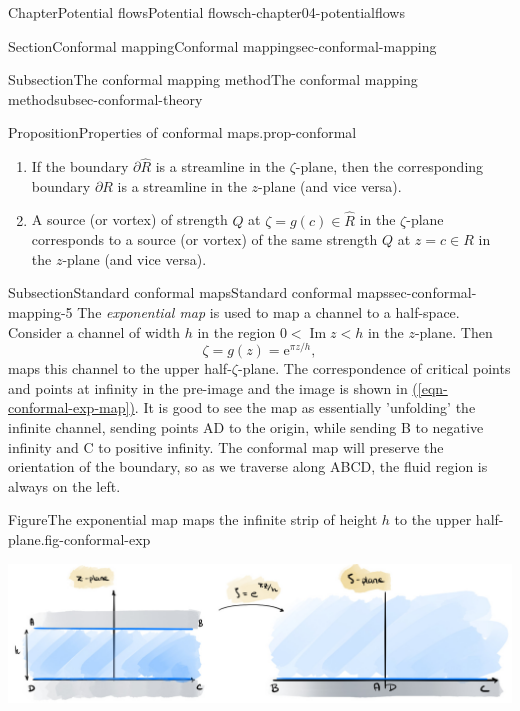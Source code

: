 \documentclass[oneside,10pt,]{book}
\newcommand{\xreffont}{\relax}
\numberwithin{equation}{section}
\renewcommand*{\Im}{\operatorname{Im}}
\newcommand{\e}{\mathrm{e}}
\begin{document}
\begin{chapterptx}{Chapter}{Potential flows}{}{Potential flows}{}{}{ch-chapter04-potentialflows}
\begin{sectionptx}{Section}{Conformal mapping}{}{Conformal mapping}{}{}{sec-conformal-mapping}
\begin{subsectionptx}{Subsection}{The conformal mapping method}{}{The conformal mapping method}{}{}{subsec-conformal-theory}
\begin{proposition}{Proposition}{Properties of conformal maps.}{}{prop-conformal}
\begin{enumerate}
\item{}If the boundary \(\partial{\hat{R}}\) is a streamline in the \(\zeta\)-plane, then the corresponding boundary \(\partial R\) is a streamline in the \(z\)-plane (and vice versa).%
\item{}A source (or vortex) of strength \(Q\) at \(\zeta = g(c) \in \hat{R}\) in the \(\zeta\)-plane corresponds to a source (or vortex) of the same strength \(Q\) at \(z = c \in R\) in the \(z\)-plane (and vice versa).%
\end{enumerate}
%
\end{proposition}
\end{subsectionptx}
%
%
\typeout{************************************************}
\typeout{************************************************}
%
\begin{subsectionptx}{Subsection}{Standard conformal maps}{}{Standard conformal maps}{}{}{sec-conformal-mapping-5}
The \emph{exponential map} is used to map a channel to a half-space. Consider a channel of width \(h\) in the region \(0 < \Im z < h\) in the \(z\)-plane. Then%
\begin{equation}
\zeta = g(z) = \e^{\pi z/h},\label{eqn-conformal-exp-map}
\end{equation}
maps this channel to the upper half-\(\zeta\)-plane. The correspondence of critical points and points at infinity in the pre-image and the image is shown in \hyperref[eqn-conformal-exp-map]{({\xreffont\ref{eqn-conformal-exp-map}})}. It is good to see the map as essentially 'unfolding' the infinite channel, sending points AD to the origin, while sending B to negative infinity and C to positive infinity. The conformal map will preserve the orientation of the boundary, so as we traverse along ABCD, the fluid region is always on the left.%
\begin{figureptx}{Figure}{The exponential map maps the infinite strip of height \(h\) to the upper half-plane.}{fig-conformal-exp}{}%
\begin{image}{0}{1}{0}{}%
\includegraphics[width=\linewidth]{external/conformal_exp.jpg}
\end{image}%

\end{figureptx}
\end{subsectionptx}
\end{sectionptx}
\end{chapterptx}
\end{document}
